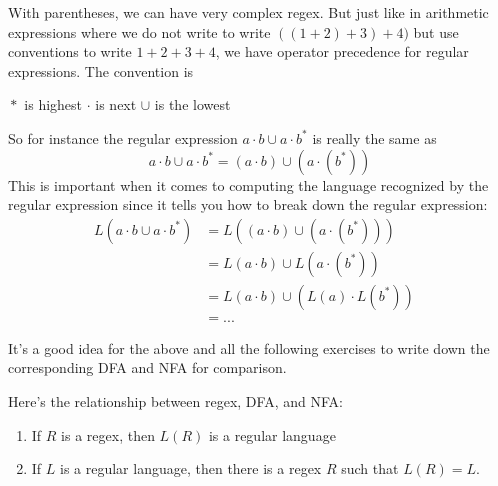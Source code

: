 With parentheses, we can have very complex regex.
But just like in arithmetic expressions where we do not write to
write $((1 + 2) + 3) + 4)$ but use conventions to write $1 + 2 + 3 + 4$,
we have operator precedence for regular expressions.
The convention is 
\begin{tightlist}
\li ${}*$ is highest
\li $\cdot $ is next
\li $\cup$ is the lowest
\end{tightlist}
So for instance the regular expression $a\cdot b \cup a\cdot b^*$ 
is really the same as
\[
a\cdot b \cup a\cdot b^*
=
(a\cdot b) \cup (a\cdot (b^*))
\]
This is important when it comes to computing the language recognized by 
the regular expression since it tells you how to break down the regular 
expression:
\begin{align*}
L(a\cdot b \cup a\cdot b^*)
&= L((a\cdot b) \cup (a\cdot (b^*))) \\
&= L(a\cdot b) \cup L(a\cdot (b^*)) \\
&= L(a\cdot b) \cup (L(a) \cdot L(b^*)) \\
&= ... &
\end{align*}





It's a good idea for the above and all the following exercises to 
write down the corresponding DFA and NFA for comparison.



















\newpage
Here's the relationship between regex, DFA, and NFA:

\begin{thm}
  \begin{enumerate}[label=\textnormal{(\alph*)},itemsep=0pt,nosep,noitemsep,partopsep=0pt,topsep=0pt,parsep=0pt]
    \mbox{}
  \item If $R$ is a regex, then $L(R)$ is a regular
    language
  \item If $L$ is a regular language, then there is a regex $R$
    such that $L(R) = L$.
  \end{enumerate}
\end{thm}

